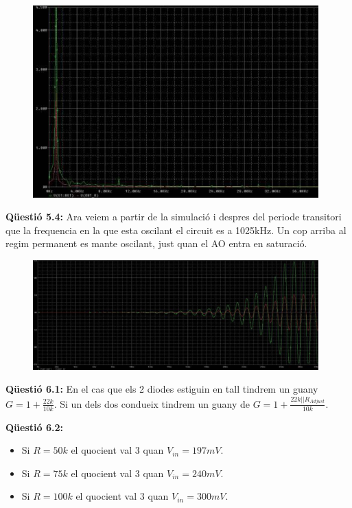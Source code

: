 \documentclass[12pt, a4papre]{article}
\begin{document}
	\begin{figure}[H]
		\begin{center}
		\includegraphics[width=110mm]{5_3_2.png}
		\end{center}
	\end{figure}
	
	\textbf{Qüestió 5.4:} Ara veiem a partir de la simulació i despres del periode transitori que la frequencia en la que esta oscilant el circuit es a 1025kHz. Un cop arriba al regim permanent es mante oscilant, just quan el AO entra en saturació.
	
	\begin{figure}[H]
		\begin{center}
		\includegraphics[width=110mm]{5_4.png}
		\end{center}
	\end{figure}
	
	\textbf{Qüestió 6.1:} En el cas que els 2 diodes estiguin en tall tindrem un guany $G = 1 + \frac{22k}{10k}$. Si un dels dos condueix tindrem un guany de $G = 1 + \frac{22k||R_{Adjust}}{10k}$.
	
	\textbf{Qüestió 6.2:} 
	
	\begin{itemize}
		\item Si $R = 50k$ el quocient val 3 quan $V_{in} = 197mV$.
		\item Si $R = 75k$ el quocient val 3 quan $V_{in} = 240mV$.
		\item Si $R = 100k$ el quocient val 3 quan $V_{in} = 300mV$.
	\end{itemize}
	
\end{document}
